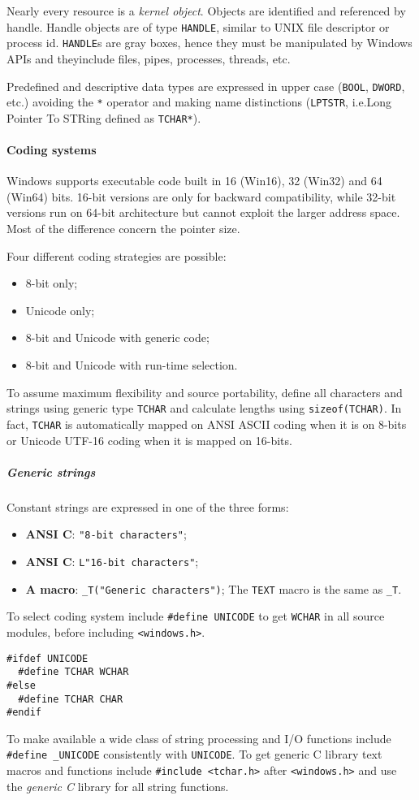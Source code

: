Nearly every resource is a \emph{kernel object}. Objects are identified and referenced by handle. Handle objects are of type \texttt{HANDLE}, similar to UNIX file descriptor or process id. \texttt{HANDLE}s are gray boxes, hence they must be manipulated by Windows APIs and theyinclude files, pipes, processes, threads, etc.

Predefined and descriptive data types are expressed in upper case (\texttt{BOOL}, \texttt{DWORD}, etc.) avoiding the \texttt{*} operator and making name distinctions (\texttt{LPTSTR}, i.e.\@ Long Pointer To STRing defined as \texttt{TCHAR*}).

\paragraph{Coding systems}
Windows supports executable code built in 16 (Win16), 32 (Win32) and 64 (Win64) bits. 16-bit versions are only for backward compatibility, while 32-bit versions run on 64-bit architecture but cannot exploit the larger address space. Most of the difference concern the pointer size. 

Four different coding strategies are possible:
\begin{itemize}
\item 8-bit only;
\item Unicode only;
\item 8-bit and Unicode with generic code;
\item 8-bit and Unicode with run-time selection.
\end{itemize}
To assume maximum flexibility and source portability, define all characters and strings using generic type \texttt{TCHAR} and calculate lengths using \texttt{sizeof(TCHAR)}. In fact, \texttt{TCHAR} is automatically mapped on ANSI ASCII coding when it is on 8-bits or Unicode UTF-16 coding when it is mapped on 16-bits.

\subparagraph{Generic strings}
Constant strings are expressed in one of the three forms:
\begin{itemize}
\item \textbf{ANSI C}: \texttt{"8-bit characters"};
\item \textbf{ANSI C}: \texttt{L"16-bit characters"};
\item \textbf{A macro}: \texttt{\_T("Generic characters")}; The \texttt{TEXT} macro is the same as \texttt{\_T}.
\end{itemize}

To select coding system include \texttt{\#define UNICODE} to get \texttt{WCHAR} in all source modules, before including \texttt{<windows.h>}.
\begin{verbatim}
#ifdef UNICODE
  #define TCHAR WCHAR
#else
  #define TCHAR CHAR
#endif
\end{verbatim}
To make available a wide class of string processing and I/O functions include \texttt{\#define \_UNICODE} consistently with \texttt{UNICODE}. To get generic C library text macros and functions include \texttt{\#include <tchar.h>} after \texttt{<windows.h>} and use the \emph{generic C} library for all string functions.

